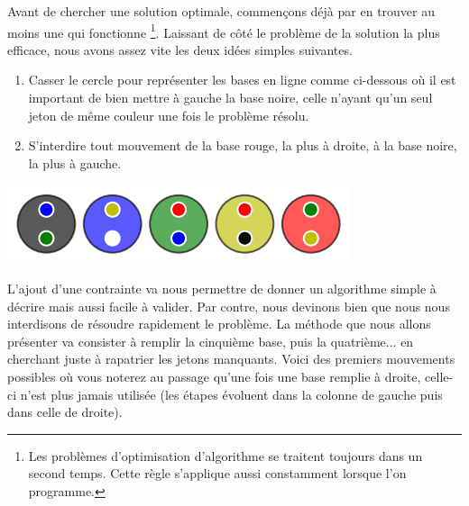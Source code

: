 Avant de chercher une solution optimale, commençons déjà par en trouver au moins une qui fonctionne
\footnote{
    Les problèmes d'optimisation d'algorithme se traitent toujours dans un second temps. Cette règle s'applique aussi constamment lorsque l'on programme.
}.
Laissant de côté le problème de la solution la plus efficace, nous avons assez vite les deux idées simples suivantes.

\begin{enumerate}
    \item Casser le cercle pour représenter les bases en ligne comme ci-dessous où il est important de bien mettre à gauche la base noire, celle n'ayant qu'un seul jeton de même couleur une fois le problème résolu.

    \item S'interdire tout mouvement de la base rouge, la plus à droite, à la base noire, la plus à gauche.
\end{enumerate}

\vspace{-0.4em}
\begin{center}   %
    \includegraphics[scale= 0.45]{content/algo_selection/example/000.png}
\end{center}
\vspace{-0.8em}


L'ajout d'une contrainte va nous permettre de donner un algorithme simple à décrire mais aussi facile à valider. Par contre, nous devinons bien que nous nous interdisons de résoudre rapidement le problème.
La méthode que nous allons présenter va consister à remplir la cinquième base, puis la quatrième... en cherchant juste à rapatrier les jetons manquants. Voici des premiers mouvements possibles où vous noterez au passage qu'une fois une base remplie à droite, celle-ci n'est plus jamais utilisée (les étapes évoluent dans la colonne de gauche puis dans celle de droite).


\medskip

